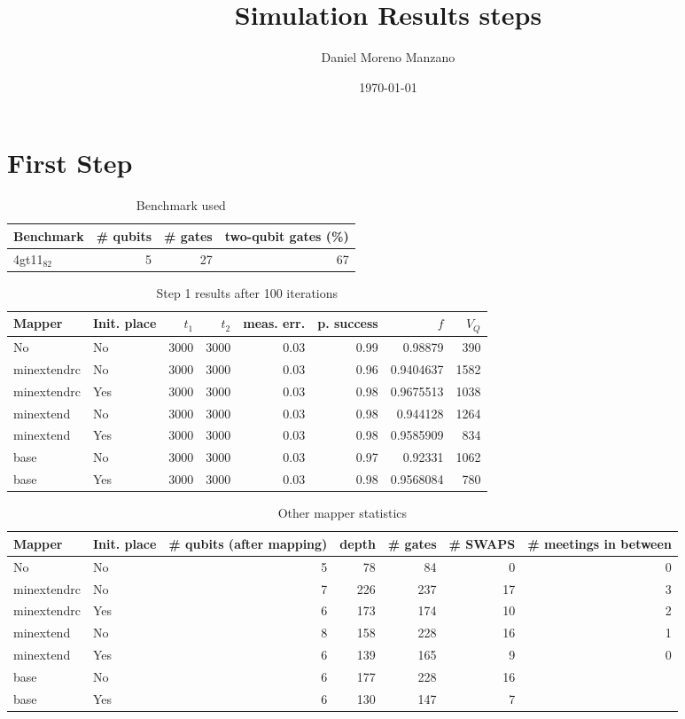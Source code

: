 \documentclass[11pt]{article}
\author{Daniel Moreno Manzano}
\date{\today}
\title{Simulation Results steps}
\begin{document}
\maketitle


\section{First Step}
\label{sec:orgee3afbe}

\begin{table}[htbp]
\caption{\label{tab:org399b892}
Benchmark used}
\centering
\begin{tabular}{lrrr}
\hline
Benchmark & \# qubits & \# gates & two-qubit gates (\%)\\
\hline
4gt11\(_{\text{82}}\) & 5 & 27 & 67\\
\hline
\end{tabular}
\end{table}

\begin{table}[htbp]
\caption{\label{tab:org4071d39}
Step 1 results after 100 iterations}
\centering
\begin{tabular}{llrrrrrr}
\hline
Mapper & Init. place & \(t_1\) & \(t_2\) & meas. err. & p. success & \(f\) & \(V_Q\)\\
\hline
No & No & 3000 & 3000 & 0.03 & 0.99 & 0.98879 & 390\\
\hline
minextendrc & No & 3000 & 3000 & 0.03 & 0.96 & 0.9404637 & 1582\\
minextendrc & Yes & 3000 & 3000 & 0.03 & 0.98 & 0.9675513 & 1038\\
minextend & No & 3000 & 3000 & 0.03 & 0.98 & 0.944128 & 1264\\
minextend & Yes & 3000 & 3000 & 0.03 & 0.98 & 0.9585909 & 834\\
base & No & 3000 & 3000 & 0.03 & 0.97 & 0.92331 & 1062\\
base & Yes & 3000 & 3000 & 0.03 & 0.98 & 0.9568084 & 780\\
\hline
\end{tabular}
\end{table}

\begin{table}[htbp]
\caption{\label{tab:org16b069a}
Other mapper statistics}
\centering
\begin{tabular}{llrrrrr}
\hline
Mapper & Init. place & \# qubits (after mapping) & depth & \# gates & \# SWAPS & \# meetings in between\\
\hline
No & No & 5 & 78 & 84 & 0 & 0\\
\hline
minextendrc & No & 7 & 226 & 237 & 17 & 3\\
minextendrc & Yes & 6 & 173 & 174 & 10 & 2\\
minextend & No & 8 & 158 & 228 & 16 & 1\\
minextend & Yes & 6 & 139 & 165 & 9 & 0\\
base & No & 6 & 177 & 228 & 16 & \\
base & Yes & 6 & 130 & 147 & 7 & \\
\hline
\end{tabular}
\end{table}
\end{document}
